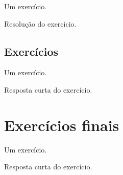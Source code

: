 \begin{exeresol}
  Um exercício.
\end{exeresol}
\begin{resol}
  Resolução do exercício.
\end{resol}

\subsection*{Exercícios}

\construirExer

\begin{exer}
  Um exercício.
\end{exer}
\begin{resp}
  Resposta curta do exercício.
\end{resp}

\section{Exercícios finais}

\construirExer

\begin{exer}
  Um exercício.
\end{exer}
\begin{resp}
  Resposta curta do exercício.
\end{resp}
